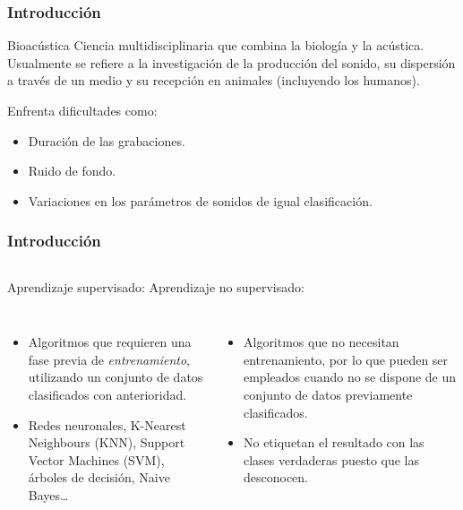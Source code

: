 \begin{frame}
    \frametitle{Introducción}

    \begin{block}{Bioacústica}
        Ciencia multidisciplinaria que combina la biología y la acústica.
        Usualmente se refiere a la investigación de la producción del sonido, su dispersión a través de un medio y su recepción en animales (incluyendo los humanos).
    \end{block}

    \pause

    Enfrenta dificultades como:
    \begin{itemize}
        \item Duración de las grabaciones.
        \item Ruido de fondo.
        \item Variaciones en los parámetros de sonidos de igual clasificación.
    \end{itemize}
\end{frame}

\begin{frame}
    \frametitle{Introducción}

    \begin{columns}
        Aprendizaje supervisado:
        Aprendizaje no supervisado:
    \end{columns}

    \begin{columns}
        \pause

        \begin{itemize}
            \item Algoritmos que requieren una fase previa de \textit{entrenamiento}, utilizando un conjunto de datos clasificados con anterioridad.
            \item Redes neuronales, K-Nearest Neighbours (KNN), Support Vector Machines (SVM), árboles de decisión, Naive Bayes\ldots
        \end{itemize}

        \pause

        \begin{itemize}
            \item Algoritmos que no necesitan entrenamiento, por lo que pueden ser empleados cuando no se dispone de un conjunto de datos previamente clasificados.
            \item No etiquetan el resultado con las clases verdaderas puesto que las desconocen.
        \end{itemize}

    \end{columns}
\end{frame}


